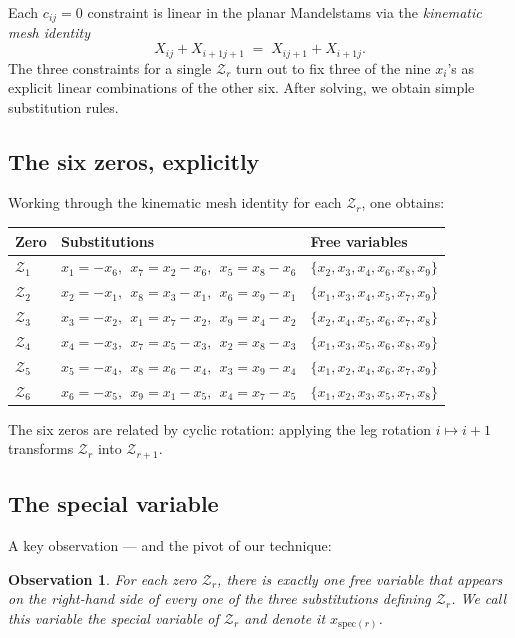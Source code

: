 \documentclass[11pt]{article}
\newcommand{\X}[2]{X_{#1#2}}
\newcommand{\Z}{\mathcal{Z}}
\newcommand{\spec}{\mathrm{spec}}
\newtheorem{observation}{Observation}
\theoremstyle{definition}
\begin{document}
Each $c_{ij}=0$ constraint is linear in the planar Mandelstams via the
\emph{kinematic mesh identity}
\[
\X{i}{j}+\X{i+1}{j+1} \;=\; \X{i}{j+1}+\X{i+1}{j}.
\]
The three constraints for a single $\Z_r$ turn out to fix three of the nine
$x_i$'s as explicit linear combinations of the other six. After solving, we
obtain simple substitution rules.

\subsection{The six zeros, explicitly}

Working through the kinematic mesh identity for each $\Z_r$, one obtains:
\begin{center}
\begin{tabular}{lll}
\toprule
Zero & Substitutions & Free variables \\
\midrule
$\Z_1$ & $x_1=-x_6,\ \ x_7=x_2-x_6,\ \ x_5=x_8-x_6$ & $\{x_2,x_3,x_4,x_6,x_8,x_9\}$ \\
$\Z_2$ & $x_2=-x_1,\ \ x_8=x_3-x_1,\ \ x_6=x_9-x_1$ & $\{x_1,x_3,x_4,x_5,x_7,x_9\}$ \\
$\Z_3$ & $x_3=-x_2,\ \ x_1=x_7-x_2,\ \ x_9=x_4-x_2$ & $\{x_2,x_4,x_5,x_6,x_7,x_8\}$ \\
$\Z_4$ & $x_4=-x_3,\ \ x_7=x_5-x_3,\ \ x_2=x_8-x_3$ & $\{x_1,x_3,x_5,x_6,x_8,x_9\}$ \\
$\Z_5$ & $x_5=-x_4,\ \ x_8=x_6-x_4,\ \ x_3=x_9-x_4$ & $\{x_1,x_2,x_4,x_6,x_7,x_9\}$ \\
$\Z_6$ & $x_6=-x_5,\ \ x_9=x_1-x_5,\ \ x_4=x_7-x_5$ & $\{x_1,x_2,x_3,x_5,x_7,x_8\}$ \\
\bottomrule
\end{tabular}
\end{center}

The six zeros are related by cyclic rotation: applying the leg rotation
$i\mapsto i+1$ transforms $\Z_r$ into $\Z_{r+1}$.

\subsection{The special variable}

A key observation --- and the pivot of our technique:

\begin{observation}
\label{obs:special}
For each zero $\Z_r$, there is exactly one free variable that appears on the
right-hand side of \emph{every} one of the three substitutions defining $\Z_r$.
We call this variable the \emph{special variable} of $\Z_r$ and denote it
$x_{\spec(r)}$.
\end{observation}
\end{document}
